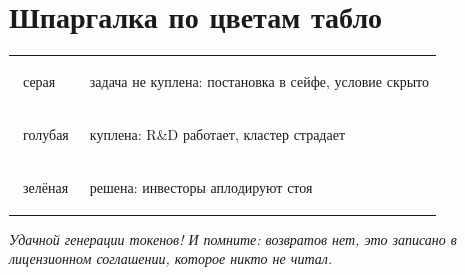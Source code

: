 \documentclass[12pt,a4paper]{article}
\begin{document}
\section*{Шпаргалка по цветам табло}

\begin{center}
\begin{tabular}{ll}
\toprule
\colorbox{gray!30}{\strut ~серая~}   & задача не куплена: постановка в сейфе, условие скрыто \\
\colorbox{cyan!40}{\strut ~голубая~} & куплена: R\&D работает, кластер страдает \\
\colorbox{green!40}{\strut ~зелёная~} & решена: инвесторы аплодируют стоя \\
\bottomrule
\end{tabular}
\end{center}

\vspace{1em}
\begin{center}
\emph{Удачной генерации токенов! И помните: возвратов нет,
это записано в лицензионном соглашении, которое никто не читал.}
\end{center}
\end{document}
